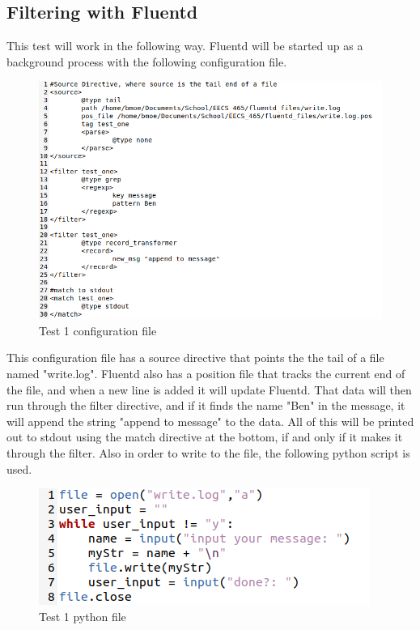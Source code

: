 \documentclass{article}
\begin{document}
\subsection{Filtering with Fluentd}
\quad \quad This test will work in the following way. Fluentd will be started up as a background process with the following configuration file.
\begin{figure}[H]
    \centering
    \includegraphics[scale=0.6]{images/t1_1.png}
    \caption{Test 1 configuration file}
    \label{fig:pic3}
\end{figure}
This configuration file has a source directive that points the the tail of a file named "write.log". Fluentd also has a position file that tracks the current end of the file, and when a new line is added it will update Fluentd.
That data will then run through the filter directive, and if it finds the name "Ben" in the message, it will append the string "append to message" to the data. All of this will be printed out to stdout using 
the match directive at the bottom, if and only if it makes it through the filter. Also in order to write to the file, the following python script is used.
\begin{figure}[H]
    \centering
    \includegraphics[scale=1]{images/t1_2.png}
    \caption{Test 1 python file}
    \label{fig:pic4}
\end{figure}
\end{document}
